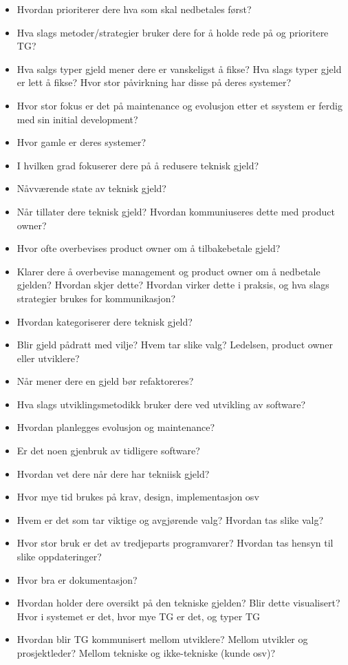 \begin{itemize}
	\item Hvordan prioriterer dere hva som skal nedbetales først?
	\item Hva slags metoder/strategier bruker dere for å holde rede på og prioritere TG?
	\item Hva salgs typer gjeld mener dere er vanskeligst å fikse? Hva slags typer gjeld er lett å fikse? Hvor stor påvirkning har disse på deres systemer?
	\item Hvor stor fokus er det på maintenance og evolusjon etter et ssystem er ferdig med sin initial development?
	\item Hvor gamle er deres systemer?
	\item I hvilken grad fokuserer dere på å redusere teknisk gjeld?
	\item Nåvværende state av teknisk gjeld?
	\item Når tillater dere teknisk gjeld? Hvordan kommuniuseres dette med product owner?
	\item Hvor ofte overbevises product owner om å tilbakebetale gjeld?
	\item Klarer dere å overbevise management og product owner om å nedbetale gjelden? Hvordan skjer dette? Hvordan virker dette i praksis, og hva slags strategier brukes for kommunikasjon?
	\item Hvordan kategoriserer dere teknisk gjeld?
	\item Blir gjeld pådratt med vilje? Hvem tar slike valg? Ledelsen, product owner eller utviklere?
	\item Når mener dere en gjeld bør refaktoreres?
	\item Hva slags utviklingsmetodikk bruker dere ved utvikling av software?
	\item Hvordan planlegges evolusjon og maintenance?
	\item Er det noen gjenbruk av tidligere software?
	\item Hvordan vet dere når dere har tekniisk gjeld?
	\item Hvor mye tid brukes på krav, design, implementasjon osv
	\item Hvem er det som tar viktige og avgjørende valg? Hvordan tas slike valg?
	\item Hvor stor bruk er det av tredjeparts programvarer? Hvordan tas hensyn til slike oppdateringer?
	\item Hvor bra er dokumentasjon?
	\item Hvordan holder dere oversikt på den tekniske gjelden? Blir dette visualisert? Hvor i systemet er det, hvor mye TG er det, og typer TG
	\item Hvordan blir TG kommunisert mellom utviklere? Mellom utvikler og prosjektleder? Mellom tekniske og ikke-tekniske (kunde osv)?
\end{itemize}